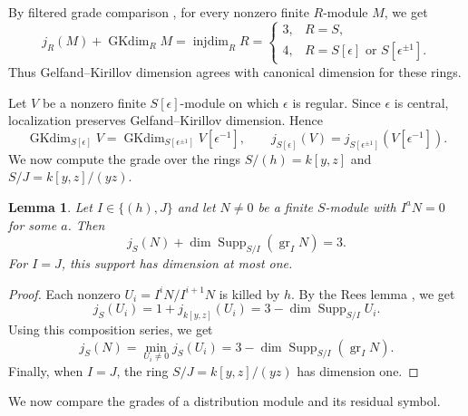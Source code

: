\documentclass[11pt]{article}
\newtheorem{lemma}[theorem]{Lemma}
\theoremstyle{definition}
\newcommand{\gr}{\operatorname{gr}}
\newcommand{\Supp}{\operatorname{Supp}}
\begin{document}
By filtered grade comparison
\cite[Chapter~III, Theorem~2.5.2]{LvO96}, for every nonzero finite $R$-module $M$,
we get 
\[
 j_R(M)+\operatorname{GKdim}_R M
 =\operatorname{injdim}_R R
 =\begin{cases}
 3,&R=S,\\
 4,&R=S[\epsilon]\text{ or }S[\epsilon^{\pm1}].
 \end{cases}
\]
Thus Gelfand--Kirillov dimension agrees with canonical dimension
for these rings.

Let $V$ be a nonzero finite $S[\epsilon]$-module on which
$\epsilon$ is regular. Since $\epsilon$ is central, localization
preserves Gelfand--Kirillov dimension. Hence
\[
 \operatorname{GKdim}_{S[\epsilon]}V
 =\operatorname{GKdim}_{S[\epsilon^{\pm1}]}
      V[\epsilon^{-1}],\qquad
 j_{S[\epsilon]}(V)
 =j_{S[\epsilon^{\pm1}]}(V[\epsilon^{-1}]).
\]
We now compute the grade over the rings
$S/(h)=k[y,z]$ and $S/J=k[y,z]/(yz)$.

\begin{lemma}\label{lem:residual-grade}
Let $I\in\{(h),J\}$ and let $N\ne0$ be a finite $S$-module
with $I^aN=0$ for some $a$. Then
\[
 j_S(N)+\dim\Supp_{S/I}(\gr_I N)=3.
\]
For $I=J$, this support has dimension at most one.
\end{lemma}
\begin{proof}
Each nonzero $U_i=I^iN/I^{i+1}N$ is killed by $h$.
By the Rees lemma \cite[Proposition~3.4(b)]{Levasseur1992}, we get
\[
 j_S(U_i)=1+j_{k[y,z]}(U_i)
 =3-\dim\Supp_{S/I}U_i.
\]
Using this composition series, we get
\[
 j_S(N)=\min_{U_i\ne0}j_S(U_i)
 =3-\dim\Supp_{S/I}(\gr_I N).
\]
Finally, when $I=J$, the ring $S/J=k[y,z]/(yz)$ has dimension one.
\end{proof}

We now compare the grades of a distribution module and its residual symbol.
\end{document}
